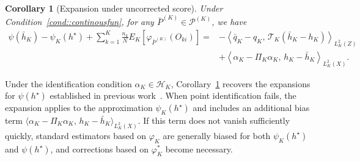 \documentclass[11pt]{article}
\theoremstyle{plain}
\newtheorem{corollary}{Corollary}
\theoremstyle{definition}
\theoremstyle{remark}
\theoremstyle{definition}
\begin{document}
 
\begin{corollary}[Expansion under uncorrected score]
\label{cor::EIF}
Under Condition~\ref{cond::continousfun}, for any \(\bar{P}^{(K)} \in \mathcal{P}^{(K)}\), we have
\begin{align*}
    \psi(\bar{h}_K) - \psi_K(h^\star)
    + \sum_{k=1}^K \frac{n_k}{N} E_{K}[\varphi_{\bar{P}^{(K)}}(O_{ki})]
    ={}& - \left\langle \bar{q}_K - q_K,\, \mathcal{T}_K(\bar{h}_K - h_K) \right\rangle_{L_K^2(Z)} \\
    & + \left\langle \alpha_K - \Pi_K \alpha_K,\, h_K- \bar{h}_K \right\rangle_{L_K^2(X)}.
\end{align*}
\end{corollary}
Under the identification condition $\alpha_K \in \mathcal{H}_K$, 
Corollary~\ref{cor::EIF} recovers the expansions for $\psi(h^\star)$ 
established in previous work~\citep{bennett2023inference, bennett2023source}. 
When point identification fails, the expansion applies to the approximation 
$\psi_K(h^\star)$ and includes an additional bias term
$\langle \alpha_K - \Pi_K \alpha_K ,\, h_K - \bar{h}_K \rangle_{L^2_K(X)}$.  
If this term does not vanish sufficiently quickly, standard estimators based on 
$\varphi_K$ are generally biased for both $\psi_K(h^\star)$ and 
$\psi(h^\star)$, and corrections based on $\varphi_K^*$ become necessary.



 

 
 

 
 

 
 

 


 
\end{document}
